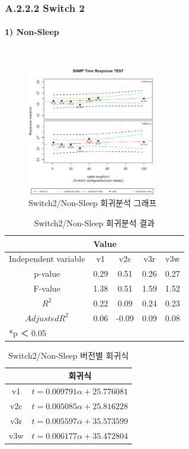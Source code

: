 \documentclass[11pt
  , a4paper
  , article
  , oneside
]{memoir}
\begin{document}
\subsubsection{A.2.2.2 Switch 2}
\paragraph{1) Non-Sleep}
   　
\begin{figure}[h!]
  \centering
  \includegraphics[width=0.5\textwidth]{./images/s2sx.eps}
  \caption{Switch2/Non-Sleep 회귀분석 그래프}
\end{figure}


\begin{table}[!htb]
\begin{center}
\begin{tabular}{c|c|c|c|c}\hline
& \multicolumn{4}{l}{Value} \\ \hline
Independent variable & v1 & v2c & v3r & v3w \\ \hline\hline
p-value& 0.29 & 0.51 & 0.26 & 0.27 \\ \hline
F-value& 1.38 & 0.51 & 1.59 & 1.52 \\ \hline
$  R^2  $ & 0.22 & 0.09 & 0.24 & 0.23 \\\hline
$ Adjusted R^2 $ & 0.06 & -0.09 & 0.09 & 0.08 \\\hline 
\multicolumn{5}{l}{*p ＜ 0.05} \\ \hline
\end{tabular}
\caption{Switch2/Non-Sleep 회귀분석 결과}
\end{center}
\end{table} 


\begin{table}[!htb]
\begin{center}
\begin{tabular}{c|c}\hline
 & 회귀식  \\ \hline\hline
v1 &  $ t=0.009791\alpha + 25.776081 $  \\ 
v2c & $ t=0.005085\alpha + 25.816228 $ \\ 
v3r & $ t=0.005597\alpha + 35.573599 $ \\ 
v3w & $ t=0.006177\alpha + 35.472804 $  \\ \hline
\end{tabular}
\caption{Switch2/Non-Sleep 버전별 회귀식}
\end{center}
\end{table} 
\end{document}
